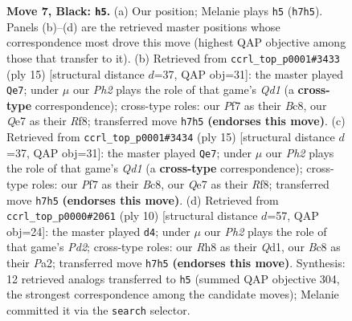 \documentclass[11pt]{article}
\begin{document}
\begin{figure}[p]
\caption{\textbf{Move 7, Black: \texttt{h5}.} (a) Our position; Melanie plays \texttt{h5} (\texttt{h7h5}). Panels (b)--(d) are the retrieved master positions whose correspondence most drove this move (highest QAP objective among those that transfer to it). (b) Retrieved from \texttt{ccrl\_top\_p0001\#3433} (ply 15) [structural distance $d$=37, QAP obj=31]: the master played \texttt{Qe7}; under $\mu$ our \emph{Ph2} plays the role of that game's \emph{Qd1} (a \textbf{cross-type} correspondence); cross-type roles: our \emph{P}f7 as their \emph{B}c8, our \emph{Q}e7 as their \emph{R}f8; transferred move \texttt{h7h5} \textbf{(endorses this move)}. (c) Retrieved from \texttt{ccrl\_top\_p0001\#3434} (ply 15) [structural distance $d$=37, QAP obj=31]: the master played \texttt{Qe7}; under $\mu$ our \emph{Ph2} plays the role of that game's \emph{Qd1} (a \textbf{cross-type} correspondence); cross-type roles: our \emph{P}f7 as their \emph{B}c8, our \emph{Q}e7 as their \emph{R}f8; transferred move \texttt{h7h5} \textbf{(endorses this move)}. (d) Retrieved from \texttt{ccrl\_top\_p0000\#2061} (ply 10) [structural distance $d$=57, QAP obj=24]: the master played \texttt{d4}; under $\mu$ our \emph{Ph2} plays the role of that game's \emph{Pd2}; cross-type roles: our \emph{R}h8 as their \emph{Q}d1, our \emph{B}c8 as their \emph{P}a2; transferred move \texttt{h7h5} \textbf{(endorses this move)}. Synthesis: 12 retrieved analogs transferred to \texttt{h5} (summed QAP objective 304, the strongest correspondence among the candidate moves); Melanie committed it via the \texttt{search} selector.}
\label{fig:thought-m13}
\end{figure}

\clearpage
\end{document}
